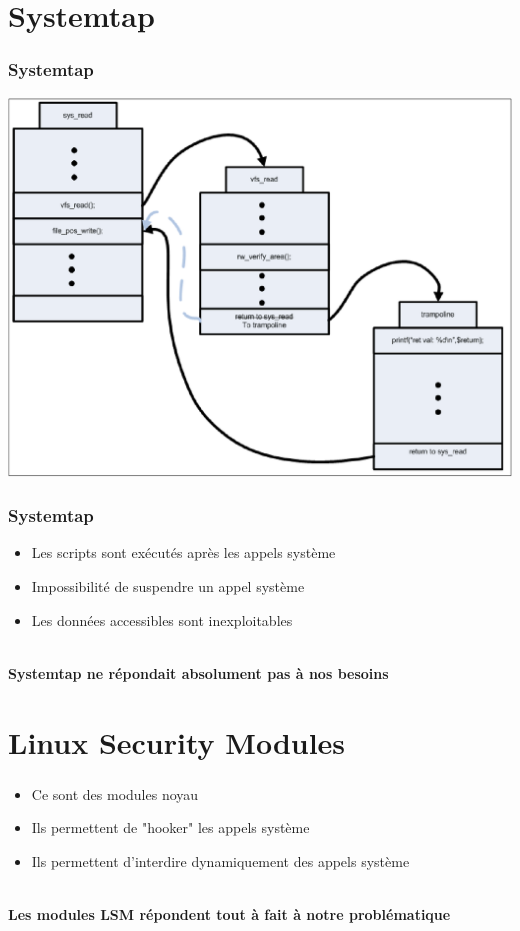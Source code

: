 \documentclass{beamer}
\begin{document}
\section{Systemtap}
\begin{frame}
\frametitle{Systemtap}
\begin{center}
	\includegraphics[scale=0.25]{attachements/kretprob.png}
\end{center}
\end{frame}

\begin{frame}
\frametitle{Systemtap}
\begin{itemize}
	\item Les scripts sont exécutés après les appels système
	\item Impossibilité de suspendre un appel système
	\item Les données accessibles sont inexploitables
\end{itemize}
~\\
\textbf{Systemtap ne répondait absolument pas à nos besoins}

\end{frame}

\section{Linux Security Modules}
\begin{frame}
\frametitle{}
	\begin{itemize}
		\item Ce sont des modules noyau
		\item Ils permettent de "hooker" les appels système
		\item Ils permettent d'interdire dynamiquement des appels système
	\end{itemize}
~\\	
\textbf{Les modules LSM répondent tout à fait à notre problématique}
\end{frame}
\end{document}
